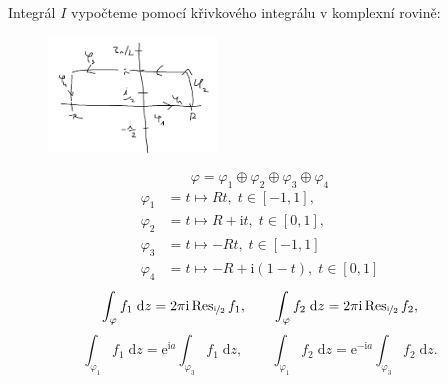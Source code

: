 \documentclass[10pt,a4paper]{article}
\newcommand{\const}[1]{\text{#1}}
\newcommand{\Res}{\operatorname{Res}}
\renewcommand{\d}[1]{\;\const{d}#1}
\newcommand{\e}[1]{\const{e}^{#1}}
\renewcommand{\i}{\const{i}}
\begin{document}
Integrál $I$ vypočteme pomocí křivkového integrálu v komplexní rovině:
\begin{figure}[H]
    \centering
    \includegraphics[width=0.4\textwidth]{du3_1.PNG}
\end{figure}
\begin{equation*}
    \varphi = \varphi_1 \oplus \varphi_2 \oplus \varphi_3 \oplus \varphi_4
\end{equation*}
\begin{align*}
    \varphi_1 &= t \mapsto Rt, \; t \in [-1, 1], \\
    \varphi_2 &= t \mapsto R + \i t, \; t \in [0, 1], \\
    \varphi_3 &= t \mapsto -Rt, \; t \in [-1, 1] \\
    \varphi_4 &= t \mapsto -R + \i(1-t), \; t \in [0, 1]
\end{align*}
\begin{align*}
    \int_\varphi f_1 \d{z} = 2\pi\i \Res_{\nicefrac{\i}{2}} f_1,
    \hspace{2em}
    \int_\varphi f_2 \d{z} = 2\pi\i \Res_{\nicefrac{\i}{2}} f_2,
\end{align*}
\begin{equation*}
    \int_{\varphi_1} f_1 \d{z} = \e{\i a} \int_{\varphi_3} f_1 \d{z},
    \hspace{2em}
    \int_{\varphi_1} f_2 \d{z} = \e{-\i a} \int_{\varphi_3} f_2 \d{z}.
\end{equation*}
\end{document}
